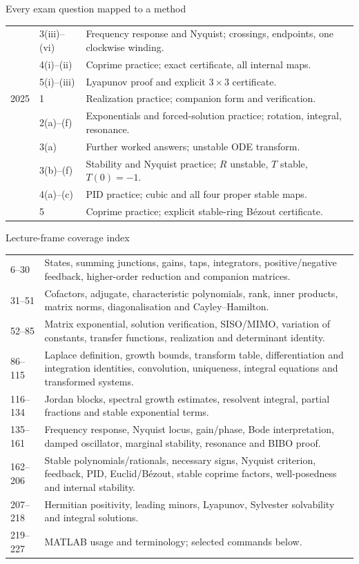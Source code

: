 \begin{concept}{Every exam question mapped to a method}
\begin{tabular}{p{.13\linewidth}p{.19\linewidth}p{.59\linewidth}}
&3(iii)--(vi)&Frequency response and Nyquist; crossings, endpoints, one clockwise winding.\\
&4(i)--(ii)&Coprime practice; exact certificate, all internal maps.\\
&5(i)--(iii)&Lyapunov proof and explicit $3\times3$ certificate.\\\midrule
2025&1&Realization practice; companion form and verification.\\
&2(a)--(f)&Exponentials and forced-solution practice; rotation, integral, resonance.\\
&3(a)&Further worked answers; unstable ODE transform.\\
&3(b)--(f)&Stability and Nyquist practice; $R$ unstable, $T$ stable, $T(0)=-1$.\\
&4(a)--(c)&PID practice; cubic and all four proper stable maps.\\
&5&Coprime practice; explicit stable-ring B\'ezout certificate.\\\bottomrule
\end{tabular}
\end{concept}
\begin{concept}{Lecture-frame coverage index}
\begin{tabular}{p{.17\linewidth}p{.74\linewidth}}
6--30&States, summing junctions, gains, taps, integrators, positive/negative feedback, higher-order reduction and companion matrices.\\
31--51&Cofactors, adjugate, characteristic polynomials, rank, inner products, matrix norms, diagonalisation and Cayley--Hamilton.\\
52--85&Matrix exponential, solution verification, SISO/MIMO, variation of constants, transfer functions, realization and determinant identity.\\
86--115&Laplace definition, growth bounds, transform table, differentiation and integration identities, convolution, uniqueness, integral equations and transformed systems.\\
116--134&Jordan blocks, spectral growth estimates, resolvent integral, partial fractions and stable exponential terms.\\
135--161&Frequency response, Nyquist locus, gain/phase, Bode interpretation, damped oscillator, marginal stability, resonance and BIBO proof.\\
162--206&Stable polynomials/rationals, necessary signs, Nyquist criterion, feedback, PID, Euclid/B\'ezout, stable coprime factors, well-posedness and internal stability.\\
207--218&Hermitian positivity, leading minors, Lyapunov, Sylvester solvability and integral solutions.\\
219--227&MATLAB usage and terminology; selected commands below.\\
\end{tabular}
\end{concept}
